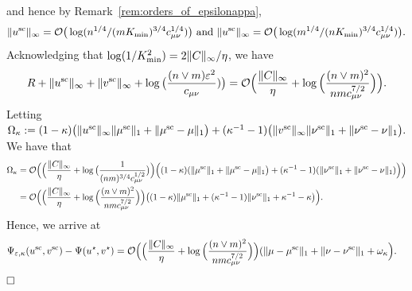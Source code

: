 and hence by Remark~\ref{rem:orders_of_epsilonappa}, 
\begin{equation*}
\|u^{\text{sc}}\|_\infty = \mathcal{O}\big(\log({n^{1/4}}/{(mK_{\min})^{3/4}c_{\mu\nu}^{1/4}})\big) \text{ and }\|u^{\text{sc}}\|_\infty =\mathcal{O}\big(\log({m^{1/4}}/{(nK_{\min})^{3/4}c_{\mu\nu}^{1/4}})\big).
\end{equation*}
Acknowledging that $\log(1/ K_{\min}^2) = 2\|C\|_\infty/\eta$, we have 
\begin{align*}
R + \|u^{\text{sc}}\|_\infty  + \|v^{\text{sc}}\|_\infty + \log\big(\frac{(n\vee m)\varepsilon^2}{c_{\mu\nu}})\big) = \mathcal{O}\Big(\frac{\|C\|_\infty}{\eta} + \log\Big(\frac{(n\vee m)^2}{nmc_{\mu\nu}^{7/2}}\Big)\Big).
\end{align*}
Letting $\Omega_{\kappa} := (1- \kappa)\big(\|{u}^{\text{sc}}\|_\infty\|{\mu}^{\text{sc}}\|_1 +\|\mu^{\text{sc}} - \mu\|_1\big) + (\kappa^{-1} - 1)\big(\|{v}^{\text{sc}}\|_\infty\|{\nu}^{\text{sc}}\|_1+\|\nu^{\text{sc}} - \nu\|_1\big).$
We have that 
\begin{align*}
\Omega_{\kappa} &=\mathcal{O}\Big(\Big(\frac{\|C\|_\infty}{\eta} + \log\big(\frac{1}{(nm)^{3/4} c_{\mu\nu}^{1/2}}\big)\Big)\Big((1- \kappa)(\|{\mu}^{\text{sc}}\|_1 +\|\mu^{\text{sc}} - \mu\|_1\big) + (\kappa^{-1} - 1)(\|{\nu}^{\text{sc}}\|_1+\|\nu^{\text{sc}} - \nu\|_1)\Big)\Big)\\
&= \mathcal{O}\Big(\Big(\frac{\|C\|_\infty}{\eta} + \log\Big(\frac{(n\vee m)^2}{nmc_{\mu\nu}^{7/2}}\Big)\Big)\big((1- \kappa)\|\mu^{\text{sc}}\|_1 + (\kappa^{-1} - 1)\|\nu^{\text{sc}}\|_1 + \kappa^{-1} - \kappa\big)\Big).
\end{align*}
Hence, we arrive at 
\begin{align*}
\Psi_{\varepsilon, \kappa}(u^{\text{sc}} ,v^{\text{sc}}) -\Psi(u^\star, v^\star) 
& = \mathcal{O}\Big(\Big(\frac{\|C\|_\infty}{\eta} + \log\Big(\frac{(n\vee m)^2}{nmc_{\mu\nu}^{7/2}}\Big)\Big)(\|\mu - {\mu}^{\text{sc}}\|_1 + \|\nu - \nu^{\text{sc}}\|_1 + \omega_{\kappa}\Big).
\end{align*}
$\hfill\square$


